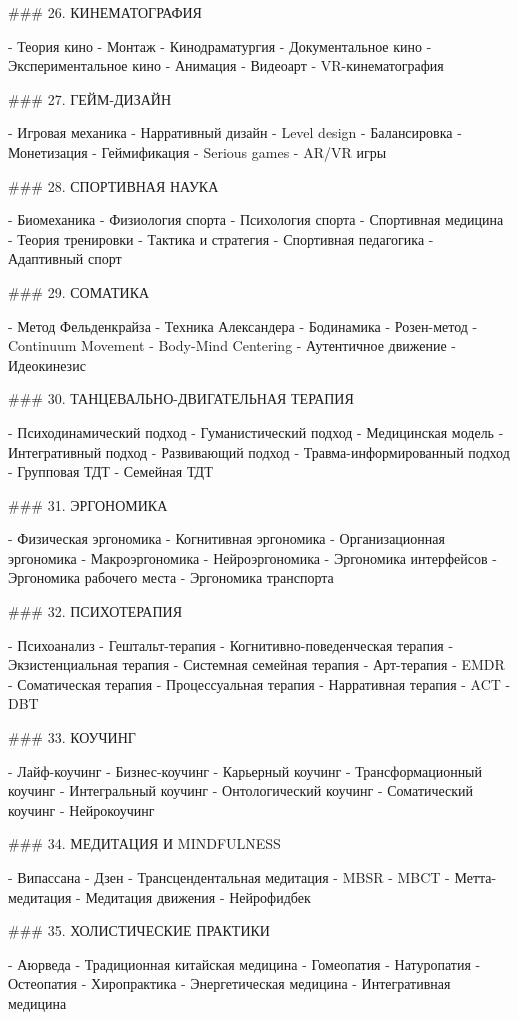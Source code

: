 ### 26. КИНЕМАТОГРАФИЯ

- Теория кино
- Монтаж
- Кинодраматургия
- Документальное кино
- Экспериментальное кино
- Анимация
- Видеоарт
- VR-кинематография

### 27. ГЕЙМ-ДИЗАЙН

- Игровая механика
- Нарративный дизайн
- Level design
- Балансировка
- Монетизация
- Геймификация
- Serious games
- AR/VR игры

### 28. СПОРТИВНАЯ НАУКА

- Биомеханика
- Физиология спорта
- Психология спорта
- Спортивная медицина
- Теория тренировки
- Тактика и стратегия
- Спортивная педагогика
- Адаптивный спорт

### 29. СОМАТИКА

- Метод Фельденкрайза
- Техника Александера
- Бодинамика
- Розен-метод
- Continuum Movement
- Body-Mind Centering
- Аутентичное движение
- Идеокинезис

### 30. ТАНЦЕВАЛЬНО-ДВИГАТЕЛЬНАЯ ТЕРАПИЯ

- Психодинамический подход
- Гуманистический подход
- Медицинская модель
- Интегративный подход
- Развивающий подход
- Травма-информированный подход
- Групповая ТДТ
- Семейная ТДТ

### 31. ЭРГОНОМИКА

- Физическая эргономика
- Когнитивная эргономика
- Организационная эргономика
- Макроэргономика
- Нейроэргономика
- Эргономика интерфейсов
- Эргономика рабочего места
- Эргономика транспорта

### 32. ПСИХОТЕРАПИЯ

- Психоанализ
- Гештальт-терапия
- Когнитивно-поведенческая терапия
- Экзистенциальная терапия
- Системная семейная терапия
- Арт-терапия
- EMDR
- Соматическая терапия
- Процессуальная терапия
- Нарративная терапия
- ACT
- DBT

### 33. КОУЧИНГ

- Лайф-коучинг
- Бизнес-коучинг
- Карьерный коучинг
- Трансформационный коучинг
- Интегральный коучинг
- Онтологический коучинг
- Соматический коучинг
- Нейрокоучинг

### 34. МЕДИТАЦИЯ И MINDFULNESS

- Випассана
- Дзен
- Трансцендентальная медитация
- MBSR
- MBCT
- Метта-медитация
- Медитация движения
- Нейрофидбек

### 35. ХОЛИСТИЧЕСКИЕ ПРАКТИКИ

- Аюрведа
- Традиционная китайская медицина
- Гомеопатия
- Натуропатия
- Остеопатия
- Хиропрактика
- Энергетическая медицина
- Интегративная медицина

